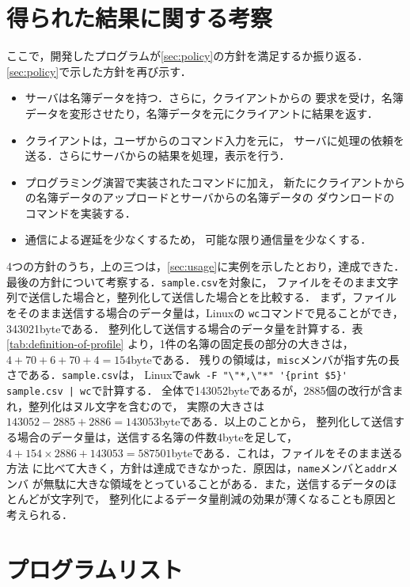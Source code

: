 \documentclass[a4j,10pt]{jarticle}
\begin{document}
\section{得られた結果に関する考察}
\label{sec:concl}
ここで，開発したプログラムが\ref{sec:policy}の方針を満足するか振り返る．
\ref{sec:policy}で示した方針を再び示す．
\begin{itemize}
\item\label{item:req:srv} サーバは名簿データを持つ．さらに，クライアントからの
  要求を受け，名簿データを変形させたり，名簿データを元にクライアントに結果を返す．
\item\label{item:req:cln} クライアントは，ユーザからのコマンド入力を元に，
  サーバに処理の依頼を送る．さらにサーバからの結果を処理，表示を行う．
\item\label{item:req:cmd} プログラミング演習で実装されたコマンドに加え，
  新たにクライアントからの名簿データのアップロードとサーバからの名簿データの
  ダウンロードのコマンドを実装する．
\item\label{item:req:cmn} 通信による遅延を少なくするため，
  可能な限り通信量を少なくする．
\end{itemize}
4つの方針のうち，上の三つは，\ref{sec:usage}に実例を示したとおり，達成できた．
最後の方針について考察する．\verb|sample.csv|を対象に，
ファイルをそのまま文字列で送信した場合と，整列化して送信した場合とを比較する．
まず，ファイルをそのまま送信する場合のデータ量は，Linuxの
\verb|wc|コマンドで見ることができ，343021byteである．
整列化して送信する場合のデータ量を計算する．表\ref{tab:definition-of-profile}
より，1件の名簿の固定長の部分の大きさは，$4+70+6+70+4=154$byteである．
残りの領域は，\verb|misc|メンバが指す先の長さである．\verb|sample.csv|は，
Linuxで\verb^awk -F "\"*,\"*" '{print $5}' sample.csv | wc^で計算する．
全体で143052byteであるが，2885個の改行が含まれ，整列化はヌル文字を含むので，
実際の大きさは$143052-2885+2886=143053$byteである．以上のことから，
整列化して送信する場合のデータ量は，送信する名簿の件数4byteを足して，
$4+154\times 2886+143053=587501$byteである．これは，ファイルをそのまま送る方法
に比べて大きく，方針は達成できなかった．原因は，\verb|name|メンバと\verb|addr|メンバ
が無駄に大きな領域をとっていることがある．また，送信するデータのほとんどが文字列で，
整列化によるデータ量削減の効果が薄くなることも原因と考えられる．
\newpage

\appendix
\section{プログラムリスト}


\end{document}
